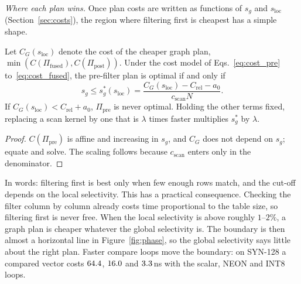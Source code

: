 \documentclass[sigconf,nonacm]{acmart}
\newcommand{\sg}{s_g}
\newcommand{\sloc}{s_{\text{loc}}}
\newcommand{\Ppre}{\Pi_{\text{pre}}}
\newcommand{\Pfus}{\Pi_{\text{fused}}}
\newcommand{\Ppost}{\Pi_{\text{post}}}
\begin{document}
\emph{Where each plan wins.} Once plan costs are written as functions of $\sg$ and $\sloc$ (Section~\ref{sec:costs}), the region where filtering first is cheapest has a simple shape.
\begin{theorem}\label{thm:crossover}
Let $C_G(\sloc)$ denote the cost of the cheaper graph plan, $\min(C(\Pfus),C(\Ppost))$. Under the cost model of Eqs.~\eqref{eq:cost_pre} to~\eqref{eq:cost_fused}, the pre-filter plan is optimal if and only if
\[
\sg\le\sg^*(\sloc)=\frac{C_G(\sloc)-C_{\text{rel}}-a_0}{c_{\text{scan}}N}.
\]
If $C_G(\sloc)<C_{\text{rel}}+a_0$, $\Ppre$ is never optimal. Holding the other terms fixed, replacing a scan kernel by one that is $\lambda$ times faster multiplies $\sg^*$ by $\lambda$.
\end{theorem}
\begin{proof}
$C(\Ppre)$ is affine and increasing in $\sg$, and $C_G$ does not depend on $\sg$; equate and solve. The scaling follows because $c_{\text{scan}}$ enters only in the denominator.
\end{proof}
In words: filtering first is best only when few enough rows match, and the cut-off depends on the local selectivity. This has a practical consequence. Checking the filter column by column already costs time proportional to the table size, so filtering first is never free. When the local selectivity is above roughly $1$--$2\%$, a graph plan is cheaper whatever the global selectivity is. The boundary is then almost a horizontal line in Figure~\ref{fig:phase}, so the global selectivity says little about the right plan. Faster compare loops move the boundary: on SYN-128 a compared vector costs $64.4$, $16.0$ and $3.3$\,ns with the scalar, NEON and INT8 loops.
\end{document}
